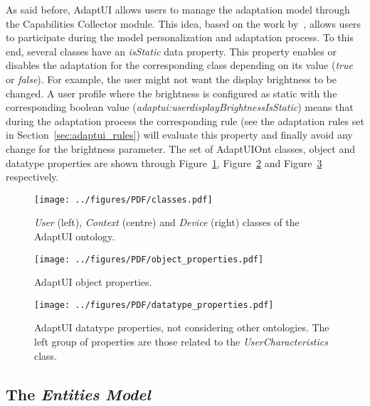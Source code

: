 As said before, AdaptUI allows users to manage the adaptation model through the
Capabilities Collector module. This idea, based on the work by~\citet{razmerita_ontology_based_2003},
allows users to participate during the model personalization and adaptation process. 
To this end, several classes have an \textit{isStatic} data property. This property
enables or disables the adaptation for the corresponding class depending on its
value (\textit{true} or \textit{false}). For example, the user might not want the
display brightness to be changed. A user profile where the brightness is configured
as static with the corresponding boolean value (\textit{adaptui:userdisplayBrightnessIsStatic})
means that during the adaptation process the corresponding rule (see the adaptation
rules set in Section~\ref{sec:adaptui_rules}) will evaluate this property
and finally avoid any change for the brightness parameter. The set of AdaptUIOnt
classes, object and datatype properties are shown through Figure~\ref{fig:classes},
Figure~\ref{fig:object_properties} and Figure~\ref{fig:datatype_properties}
respectively.

\begin{figure}
\centering
\texttt{[image: ../figures/PDF/classes.pdf]}
\caption{\textit{User} (left), \textit{Context} (centre)
and \textit{Device} (right) classes of the AdaptUI ontology.}
\label{fig:classes}
\end{figure}

\begin{figure}
\centering
\texttt{[image: ../figures/PDF/object\_properties.pdf]}
\caption{AdaptUI object properties.}
\label{fig:object_properties}
\end{figure}

\begin{figure}
\centering
\texttt{[image: ../figures/PDF/datatype\_properties.pdf]}
\caption{AdaptUI datatype properties, not considering other ontologies. The left
group of properties are those related to
the \textit{UserCharacteristics} class.}
\label{fig:datatype_properties}
\end{figure}


\subsection{The \textit{Entities Model}}
\label{sec:entities_model}

